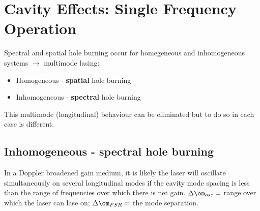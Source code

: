 \documentclass[a4paper, 11pt, normalem]{report}
\begin{document}
\chapter{Cavity Effects: Single Frequency Operation}
Spectral and spatial hole burning occur for homegeneous and inhomogeneous systems $\to$ multimode lasing:
\begin{itemize}
    \item Homogeneous - \textbf{spatial} hole burning
    \item Inhomogeneous - \textbf{spectral} hole burning
\end{itemize}
This multimode (longitudinal) behaviour can be eliminated but to do so in each case is different.

\section{Inhomogeneous - spectral hole burning}
In a Doppler broadened gain medium, it is likely the laser will oscillate simultaneously on several longitudinal modes if the cavity mode spacing is less than the range of frequencies over which there is net gain. 
$\Delta\om_{osc} =$ range over which the laser can lase on; $\Delta\om_{FSR} =$ the mode separation.
\end{document}
